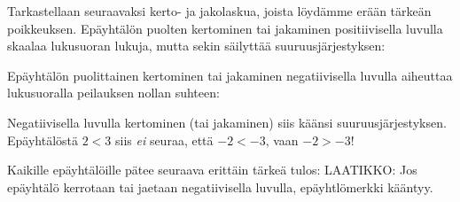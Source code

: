 \begin{lukusuora}{-1}{10}{12}

\lukusuorauusi
\end{lukusuora}

Tarkastellaan seuraavaksi kerto- ja jakolaskua, joista löydämme erään tärkeän poikkeuksen. Epäyhtälön puolten kertominen tai jakaminen positiivisella luvulla skaalaa lukusuoran lukuja, mutta sekin säilyttää suuruusjärjestyksen:

\begin{lukusuora}{-1}{10}{12}

\lukusuorauusi
\end{lukusuora}

\begin{lukusuora}{-1}{10}{12}

\lukusuorauusi
\end{lukusuora}

Epäyhtälön puolittainen kertominen tai jakaminen negatiivisella luvulla aiheuttaa lukusuoralla peilauksen nollan suhteen:

\begin{lukusuora}{-6}{10}{6}

\lukusuorauusi
\end{lukusuora}

Negatiivisella luvulla kertominen (tai jakaminen) siis käänsi suuruusjärjestyksen.
Epäyhtälöstä $2<3$ siis \textit{ei} seuraa, että $-2<-3$, vaan $-2>-3$!

Kaikille epäyhtälöille pätee seuraava erittäin tärkeä tulos:
LAATIKKO: Jos epäyhtälö kerrotaan tai jaetaan negatiivisella luvulla, epäyhtlömerkki kääntyy.

